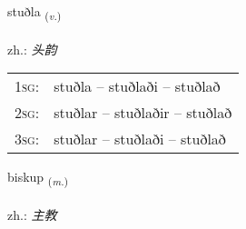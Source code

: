 \documentclass[frontgrid, backgrid]{flacards}\usepackage[]{graphicx}\usepackage[]{xcolor}
\begin{document}
\renewcommand{\flhead}{\vskip5pt \fboxsep=0pt {\small\bfseries\footnotesize Sagnorð | 动词}}
\renewcommand{\fcfoot}{\vskip5pt \fboxsep=0pt \hspace{2pt}{\small\bfseries\footnotesize 1K}}

\renewcommand{\blhead}{\vskip5pt {\small\bfseries\footnotesize Sagnorð | 动词 }}
\renewcommand{\bcfoot}{\vskip5pt \hspace{2pt}{\small\bfseries\footnotesize 1K}}


{stuðla \small{\textsubscript{(\textit{v.})}} \\[1ex] %
\textphonetic{[stʏðla]} \\
zh.: \emph{头韵} \\  [2ex]
\renewcommand*{\arraystretch}{0.8}
\begin{tabular}{p{1cm}l}
\textsc{1sg}: & stuðla -- stuðlaði -- stuðlað \\ 
\textsc{2sg}: & stuðlar -- stuðlaðir -- stuðlað \\ 
\textsc{3sg}: & stuðlar -- stuðlaði -- stuðlað \\ 
\end{tabular}
}

\renewcommand{\flhead}{\vskip5pt \fboxsep=0pt {\small\bfseries\footnotesize Nafnorð | 名词}}
\renewcommand{\fcfoot}{\vskip5pt \fboxsep=0pt \hspace{2pt}{\small\bfseries\footnotesize 1K}}

\renewcommand{\blhead}{\vskip5pt {\small\bfseries\footnotesize Nafnorð | 名词 }}
\renewcommand{\bcfoot}{\vskip5pt \hspace{2pt}{\small\bfseries\footnotesize 1K}}


{biskup \small{\textsubscript{(\textit{m.})}} \\[1ex] %
\textphonetic{[pɪskʏp]} \\
zh.: \emph{主教} \\  [2ex]
\renewcommand*{\arraystretch}{0.8}
}
\end{document}

